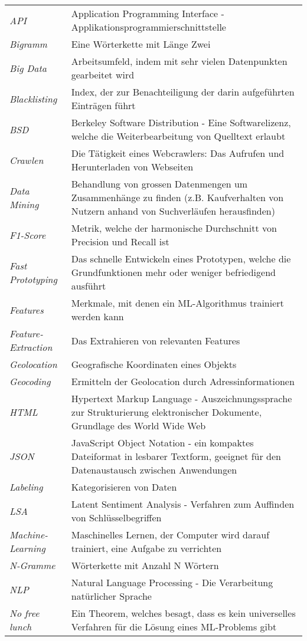 \begin{table}[H]
	\begin{tabular}{>{\em}p{4cm}p{12cm}}
		API & Application Programming Interface - Applikationsprogrammierschnittstelle\\
		Bigramm & Eine Wörterkette mit Länge Zwei\\
		Big Data & Arbeitsumfeld, indem mit sehr vielen Datenpunkten gearbeitet wird\\
		Blacklisting & Index, der zur Benachteiligung der darin aufgeführten Einträgen führt\\
		BSD & Berkeley Software Distribution - Eine Softwarelizenz, welche die Weiterbearbeitung von Quelltext erlaubt\\
		Crawlen & Die Tätigkeit eines Webcrawlers: Das Aufrufen und Herunterladen von Webseiten\\
		Data Mining & Behandlung von grossen Datenmengen um Zusammenhänge zu finden (z.B. Kaufverhalten von Nutzern anhand von Suchverläufen herausfinden)\\
		F1-Score & Metrik, welche der harmonische Durchschnitt von Precision und Recall ist\\
		Fast Prototyping & Das schnelle Entwickeln eines Prototypen, welche die Grundfunktionen mehr oder weniger befriedigend ausführt\\
		Features & Merkmale, mit denen ein ML-Algorithmus trainiert werden kann\\
		Feature-Extraction & Das Extrahieren von relevanten Features\\
		Geolocation & Geografische Koordinaten eines Objekts\\
		Geocoding & Ermitteln der Geolocation durch Adressinformationen\\
		HTML & Hypertext Markup Language - Auszeichnungssprache zur Strukturierung elektronischer Dokumente, Grundlage des World Wide Web\\
		JSON & JavaScript Object Notation - ein kompaktes Dateiformat in lesbarer Textform, geeignet für den Datenaustausch zwischen Anwendungen\\
		Labeling & Kategorisieren von Daten\\
		LSA & Latent Sentiment Analysis - Verfahren zum Auffinden von Schlüsselbegriffen\\
		Machine-Learning & Maschinelles Lernen, der Computer wird darauf trainiert, eine Aufgabe zu verrichten\\
		N-Gramme & Wörterkette mit Anzahl N Wörtern\\
		NLP & Natural Language Processing - Die Verarbeitung natürlicher Sprache\\
		No free lunch & Ein Theorem, welches besagt, dass es kein universelles Verfahren für die Lösung eines ML-Problems gibt\\
		
	\end{tabular}
\end{table}
